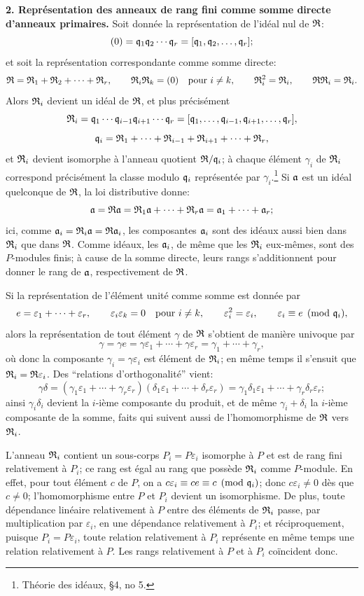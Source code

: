 \textbf{2. Représentation des anneaux de rang fini comme somme directe d'anneaux primaires.} Soit donnée la représentation de l'idéal nul de $\mathfrak R$:
\[
   (0)=\mathfrak q_1\mathfrak q_2\cdots\mathfrak q_r
      =[\mathfrak q_1,\mathfrak q_2,\ldots,\mathfrak q_r];
\]
et soit la représentation correspondante comme somme directe:
\[
   \mathfrak R=\mathfrak R_1+\mathfrak R_2+\cdots+\mathfrak R_r,
   \qquad
   \mathfrak R_i\mathfrak R_k=(0)\quad\hbox{pour } i\ne k,
   \qquad
   \mathfrak R_i^2=\mathfrak R_i,
   \qquad
   \mathfrak R\mathfrak R_i=\mathfrak R_i.
\]
Alors $\mathfrak R_i$ devient un idéal de $\mathfrak R$, et plus précisément
\[
   \mathfrak R_i
   =\mathfrak q_1\cdots\mathfrak q_{i-1}\mathfrak q_{i+1}\cdots\mathfrak q_r
   =[\mathfrak q_1,\ldots,\mathfrak q_{i-1},\mathfrak q_{i+1},\ldots,\mathfrak q_r],
\]
\[
   \mathfrak q_i=\mathfrak R_1+\cdots+\mathfrak R_{i-1}+\mathfrak R_{i+1}+\cdots+\mathfrak R_r,
\]
et $\mathfrak R_i$ devient isomorphe à l'anneau quotient $\mathfrak R/\mathfrak q_i$; à chaque élément $\gamma_i$ de $\mathfrak R_i$ correspond précisément la classe modulo $\mathfrak q_i$ représentée par $\gamma_i$.\footnote{Théorie des idéaux, \S 4, no 5.} Si $\mathfrak a$ est un idéal quelconque de $\mathfrak R$, la loi distributive donne:
\[
   \mathfrak a=\mathfrak R\mathfrak a
   =\mathfrak R_1\mathfrak a+\cdots+\mathfrak R_r\mathfrak a
   =\mathfrak a_1+\cdots+\mathfrak a_r;
\]
ici, comme $\mathfrak a_i=\mathfrak R_i\mathfrak a=\mathfrak R\mathfrak a_i$, les composantes $\mathfrak a_i$ sont des idéaux aussi bien dans $\mathfrak R_i$ que dans $\mathfrak R$. Comme idéaux, les $\mathfrak a_i$, de même que les $\mathfrak R_i$ eux-mêmes, sont des $P$-modules finis; à cause de la somme directe, leurs rangs s'additionnent pour donner le rang de $\mathfrak a$, respectivement de $\mathfrak R$.

Si la représentation de l'élément unité comme somme est donnée par
\[
   e=\varepsilon_1+\cdots+\varepsilon_r,
   \qquad
   \varepsilon_i\varepsilon_k=0\quad\hbox{pour } i\ne k,
   \qquad
   \varepsilon_i^2=\varepsilon_i,
   \qquad
   \varepsilon_i\equiv e\pmod{\mathfrak q_i},
\]
alors la représentation de tout élément $\gamma$ de $\mathfrak R$ s'obtient de manière univoque par
\[
   \gamma=\gamma e=\gamma\varepsilon_1+\cdots+\gamma\varepsilon_r
      =\gamma_1+\cdots+\gamma_r,
\]
où donc la composante $\gamma_i=\gamma\varepsilon_i$ est élément de $\mathfrak R_i$; en même temps il s'ensuit que $\mathfrak R_i=\mathfrak R\varepsilon_i$. Des ``relations d'orthogonalité'' vient:
\[
   \gamma\delta=(\gamma_1\varepsilon_1+\cdots+\gamma_r\varepsilon_r)
      (\delta_1\varepsilon_1+\cdots+\delta_r\varepsilon_r)
   =\gamma_1\delta_1\varepsilon_1+\cdots+\gamma_r\delta_r\varepsilon_r;
\]
ainsi $\gamma_i\delta_i$ devient la $i$-ième composante du produit, et de même $\gamma_i+\delta_i$ la $i$-ième composante de la somme, faits qui suivent aussi de l'homomorphisme de $\mathfrak R$ vers $\mathfrak R_i$.

L'anneau $\mathfrak R_i$ contient un sous-corps $P_i=P\varepsilon_i$ isomorphe à $P$ et est de rang fini relativement à $P_i$; ce rang est égal au rang que possède $\mathfrak R_i$ comme $P$-module. En effet, pour tout élément $c$ de $P$, on a $c\varepsilon_i\equiv ce\equiv c\pmod{\mathfrak q_i}$; donc $c\varepsilon_i\ne0$ dès que $c\ne0$; l'homomorphisme entre $P$ et $P_i$ devient un isomorphisme. De plus, toute dépendance linéaire relativement à $P$ entre des éléments de $\mathfrak R_i$ passe, par multiplication par $\varepsilon_i$, en une dépendance relativement à $P_i$; et réciproquement, puisque $P_i=P\varepsilon_i$, toute relation relativement à $P_i$ représente en même temps une relation relativement à $P$. Les rangs relativement à $P$ et à $P_i$ coïncident donc.

